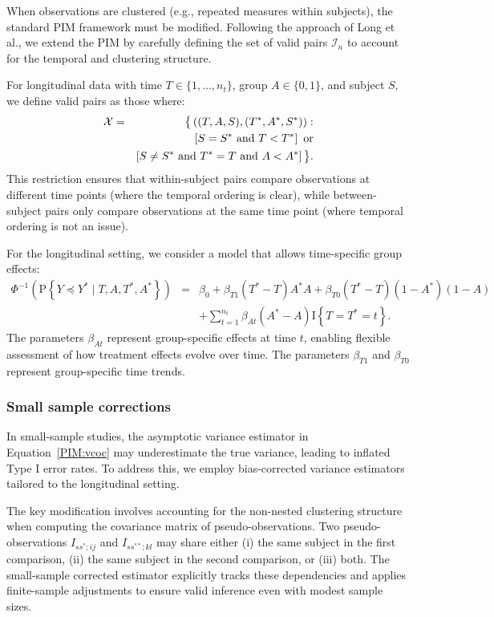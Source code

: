 \documentclass[alpha-refs]{wiley-article}
\newcommand{\prob}[1]
  {\text{P}\left\{#1\right\}}
\newcommand{\indicat}[1]
  {\text{I} \left\{ #1 \right\}}
\newcommand{\leqs}{\preccurlyeq}
\begin{document}
When observations are clustered (e.g., repeated measures within subjects), the standard PIM framework must be modified. Following the approach of Long et al., we extend the PIM by carefully defining the set of valid pairs $\mathcal{I}_n$ to account for the temporal and clustering structure.

For longitudinal data with time $T \in \{1, \ldots, n_t\}$, group $A \in \{0, 1\}$, and subject $S$, we define valid pairs as those where:
\begin{eqnarray*}
    {\cal{X}} &=& \big\{ \left((T,A,S), (T^*,A^*,S^*)\right) :  \\
    & & \left[S=S^* \text{ and } T<T^*\right] \text{ or}  \\
    & & \left[S\neq S^* \text{ and } T^*=T \text{ and } A<A^*\right]\big\}.
\end{eqnarray*}
This restriction ensures that within-subject pairs compare observations at different time points (where the temporal ordering is clear), while between-subject pairs only compare observations at the same time point (where temporal ordering is not an issue).

For the longitudinal setting, we consider a model that allows time-specific group effects:
\begin{eqnarray*}
    \Phi^{-1}(\prob{Y \leqs Y^* \mid T,A,T^*,A^*})
    &=& \beta_0 + \beta_{T1} (T^*-T)A^*A + \beta_{T0} (T^*-T)(1-A^*)(1-A) \\
    & &   + \sum_{t=1}^{n_t}\beta_{At} (A^*-A)\indicat{T=T^*=t}.
\end{eqnarray*}
The parameters $\beta_{At}$ represent group-specific effects at time $t$, enabling flexible assessment of how treatment effects evolve over time. The parameters $\beta_{T1}$ and $\beta_{T0}$ represent group-specific time trends.

\subsubsection{Small sample corrections}

In small-sample studies, the asymptotic variance estimator in Equation~\eqref{PIM:vcoc} may underestimate the true variance, leading to inflated Type I error rates. To address this, we employ bias-corrected variance estimators tailored to the longitudinal setting.

The key modification involves accounting for the non-nested clustering structure when computing the covariance matrix of pseudo-observations. Two pseudo-observations $I_{ss^*;ij}$ and $I_{ss^{**};kl}$ may share either (i) the same subject in the first comparison, (ii) the same subject in the second comparison, or (iii) both. The small-sample corrected estimator explicitly tracks these dependencies and applies finite-sample adjustments to ensure valid inference even with modest sample sizes.
\end{document}
